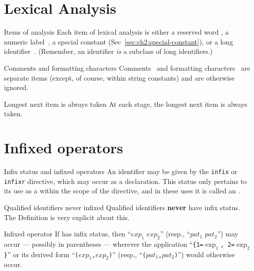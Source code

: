 \section{Lexical Analysis}

\begin{clause}{Items of analysis}
Each item of lexical analysis is either a reserved word
,
a numeric label~, 
a special constant (Sec~\ref{sec:ch2:special-constant}),
or a long identifier~.
(Remember, an identifier \emph{is} a subclass of long identifiers.)
\end{clause}

\begin{clause}{Comments and formatting characters}
Comments~ and formatting
characters~ are separate
items (except, of course, within string constants) and are otherwise ignored.
\end{clause}

\begin{clause}{Longest next item is always taken}
At each stage, the longest next item is always taken.
\end{clause}

\section{Infixed operators}

\begin{definition}{Infix status and infixed operators}
An identifier may be given  by the \texttt{infix}
or \texttt{infixr} directive, which may occur as a declaration.
This status only pertains to its use as a \nonterminal{\vid} within the scope of the
directive, and in these uses it is called an .
\end{definition}

\begin{clause}{Qualified identifiers never infixed}
Qualified identifiers \textbf{never} have infix status. The
Definition is very explicit about this.
\end{clause}

\begin{example}{Infixed operator}
If \nonterminal{\vid} has infix status, then ``$exp_{1}$
\nonterminal{\vid} $exp_{2}$'' (resp., 
``$pat_{1}$ \nonterminal{\vid} $pat_{2}$'') may occur --- possibly in parentheses ---
wherever the application ``\nonterminal{\vid}\verb+{+{\tt 1=}$\exp_{1}$\verb+,+{\tt
2=}$\exp_{2}$\verb+}+'' or its derived form ``\nonterminal{\vid}\verb+(+$exp_{1}$\verb+,+$exp_{2}$\verb+)+'' (resp.,
``\nonterminal{\vid}\verb+(+$pat_{1}$\verb+,+$pat_{2}$\verb+)+'') would otherwise
occur.
\end{example}

